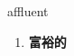 
\begin{frame}
{\huge affluent}
\begin{center}
\begin{enumerate}\Large
  \item \textbf{富裕的}
\end{enumerate}
\end{center}
\end{frame}
